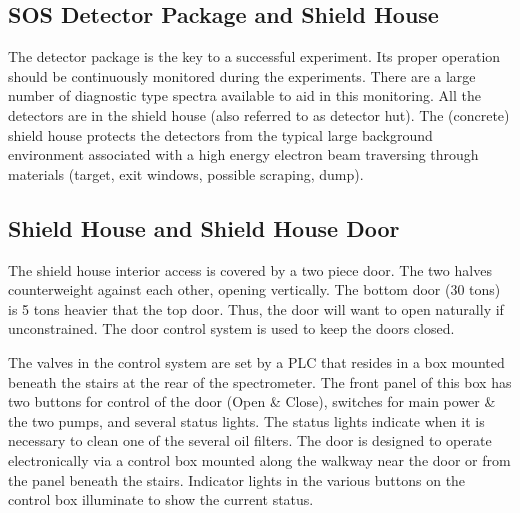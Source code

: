 \begin{obsolete}

\section{SOS Detector Package and Shield House }

The detector package is the key to a successful experiment. Its proper
operation should be continuously monitored during the experiments.
There are a large number of diagnostic type spectra available to aid in
this monitoring.
All the detectors are in the shield house (also referred to as detector hut).
The (concrete) shield house protects the detectors from the typical large
background environment associated with a high energy electron beam
traversing through materials (target, exit windows, possible scraping, dump).

\subsection{Shield House and Shield House Door}

The shield house interior access is covered by a two piece door. The two
halves counterweight against each other, opening vertically. The bottom
door (30 tons) is 5 tons heavier that the top door. Thus, the door will want
to open naturally if unconstrained. The door control system is used to keep
the doors closed.

The valves in the control system are set by a PLC that resides in a box
mounted beneath the stairs at the rear of the spectrometer. The front panel
of this box has two buttons for control of the door (Open \& Close),
switches for main power \& the two pumps, and several status lights. The
status lights indicate when it is necessary to clean one of the several oil
filters. The door is designed to operate electronically via a control box
mounted along the walkway near the door or from the panel beneath the
stairs. Indicator lights in the various buttons on the control box
illuminate to show the current status.


\end{obsolete}
